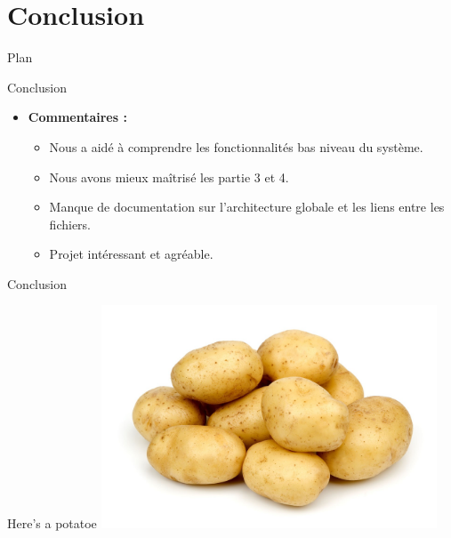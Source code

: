 \documentclass{beamer}
\begin{document}
\section{Conclusion}
\begin{frame}{Plan}
    \tableofcontents[currentsection]
\end{frame}

\begin{frame}{Conclusion}
	\begin{itemize}
		\item \textbf{Commentaires :}
		\begin{itemize}
			\item Nous a aidé à comprendre les fonctionnalités bas niveau du système.
			\item Nous avons mieux maîtrisé les partie 3 et 4.
			\item Manque de documentation sur l'architecture globale et les liens entre les fichiers.
			\item Projet intéressant et agréable.
		\end{itemize}
	\end{itemize}
\end{frame}

\begin{frame}{Conclusion}
\end{frame}

\begin{frame}{Here's a potatoe}
	\includegraphics[width=10cm]{potatoes.jpg}	
\end{frame}
\end{document}

